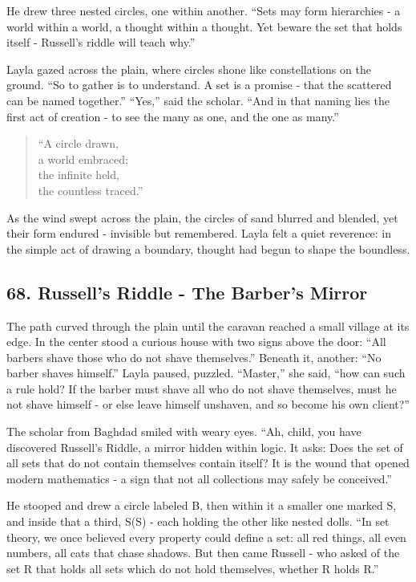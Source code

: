 \documentclass[
  letterpaper,
  DIV=11,
  numbers=noendperiod]{scrreprt}
\begin{document}
He drew three nested circles, one within another. ``Sets may form
hierarchies - a world within a world, a thought within a thought. Yet
beware the set that holds itself - Russell's riddle will teach why.''

Layla gazed across the plain, where circles shone like constellations on
the ground. ``So to gather is to understand. A set is a promise - that
the scattered can be named together.'' ``Yes,'' said the scholar. ``And
in that naming lies the first act of creation - to see the many as one,
and the one as many.''

\begin{quote}
``A circle drawn,\\
a world embraced;\\
the infinite held,\\
the countless traced.''
\end{quote}

As the wind swept across the plain, the circles of sand blurred and
blended, yet their form endured - invisible but remembered. Layla felt a
quiet reverence: in the simple act of drawing a boundary, thought had
begun to shape the boundless.

\subsection{68. Russell's Riddle - The Barber's
Mirror}\label{russells-riddle---the-barbers-mirror}

The path curved through the plain until the caravan reached a small
village at its edge. In the center stood a curious house with two signs
above the door: ``All barbers shave those who do not shave themselves.''
Beneath it, another: ``No barber shaves himself.'' Layla paused,
puzzled. ``Master,'' she said, ``how can such a rule hold? If the barber
must shave all who do not shave themselves, must he not shave himself -
or else leave himself unshaven, and so become his own client?''

The scholar from Baghdad smiled with weary eyes. ``Ah, child, you have
discovered Russell's Riddle, a mirror hidden within logic. It asks: Does
the set of all sets that do not contain themselves contain itself? It is
the wound that opened modern mathematics - a sign that not all
collections may safely be conceived.''

He stooped and drew a circle labeled B, then within it a smaller one
marked S, and inside that a third, S(S) - each holding the other like
nested dolls. ``In set theory, we once believed every property could
define a set: all red things, all even numbers, all cats that chase
shadows. But then came Russell - who asked of the set R that holds all
sets which do not hold themselves, whether R holds R.''
\end{document}
